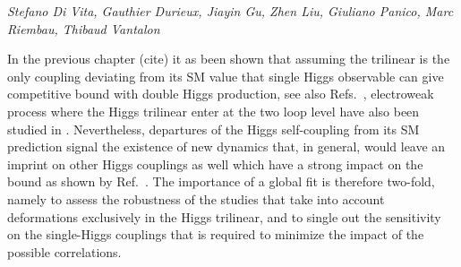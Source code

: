 \begin{center}
	\textit{Stefano Di Vita, Gauthier Durieux, Jiayin Gu, Zhen Liu, Giuliano Panico, Marc Riembau, Thibaud Vantalon}
\end{center} 

In the previous chapter (cite) it as been shown that assuming the trilinear is the only coupling deviating from its SM value that single Higgs observable can give competitive bound with double Higgs production, see also Refs.~\cite{Gorbahn:2016uoy,Degrassi:2016wml,Bizon:2016wgr,Degrassi:2017ucl,Maltoni:2017ims}, electroweak process where the Higgs trilinear enter at the two loop level have also been studied in \cite{Kribs:2017znd}. Nevertheless, departures of the Higgs self-coupling from its SM prediction signal the existence of new dynamics that, in general, would leave an imprint on other Higgs couplings as well which have a strong impact on the bound as shown by Ref.~\cite{DiVita:2017eyz}. The importance of a global fit is therefore two-fold, namely to assess the robustness of the studies that take into account deformations exclusively in the Higgs trilinear, and to single out the sensitivity on the single-Higgs couplings that is required to minimize the impact of the possible correlations.



\medskip

